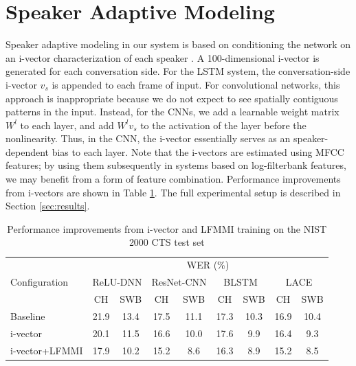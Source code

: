 \documentclass{article}
\begin{document}
\section{Speaker Adaptive Modeling}
\label{sec:sam}
Speaker adaptive modeling in our system is based on 
conditioning the network on an i-vector  \cite{dehak2011front}  
characterization of each 
speaker \cite{saon2013speaker,saonSRK16}.
A 100-dimensional i-vector is generated for each conversation side.
For the LSTM system,
the conversation-side i-vector $v_s$ is appended to each frame of input.
For convolutional networks, this approach is inappropriate because
we do not expect to see spatially contiguous patterns in the input.
Instead, for the CNNs, we add a learnable weight matrix $W^l$ to each 
layer, and add $W^l v_s$ to the activation of the layer before the 
nonlinearity. Thus, in the CNN, the i-vector essentially serves as an 
speaker-dependent bias to each layer. Note that the i-vectors are estimated
using MFCC features; by using them subsequently in systems based on
log-filterbank features, we may benefit from a form of feature 
combination.
Performance improvements from i-vectors are shown in Table \ref{tab:lfmmi}. 
The full experimental setup is described in Section \ref{sec:results}.
\begin{table}[t]
    \centering
\caption{Performance improvements from i-vector and LFMMI training on the NIST 2000 CTS test set}
\vspace{0.1in}
\label{tab:lfmmi}
        \small
    \begin{tabular}{|l|c|c|c|c|c|c|c|c|}
    \hline
        \multirow{3}{*}{Configuration} & \multicolumn{8}{c|}{WER (\%)}                                  \\ \cline{2-9}
                               & \multicolumn{2}{c|}{ReLU-DNN} & \multicolumn{2}{c|}{ResNet-CNN}
				& \multicolumn{2}{c|}{BLSTM} & \multicolumn{2}{c|}{LACE}\\ \cline{2-9}
                                & CH    & SWB   & CH	& SWB	& CH    & SWB   & CH    & SWB   \\ \hline
        Baseline                & 21.9  & 13.4  & 17.5	& 11.1	& 17.3  &  10.3 & 16.9  & 10.4          \\ \hline
        i-vector                & 20.1  & 11.5  & 16.6	& 10.0	& 17.6  &  9.9  & 16.4  & 9.3     \\ \hline
        i-vector+LFMMI          & 17.9  & 10.2  & 15.2	& 8.6	& 16.3  &  8.9  & 15.2  & 8.5           \\ \hline
        \end{tabular}
\end{table}
\end{document}
